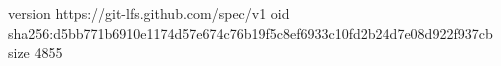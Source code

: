 version https://git-lfs.github.com/spec/v1
oid sha256:d5bb771b6910e1174d57e674c76b19f5c8ef6933c10fd2b24d7e08d922f937cb
size 4855
